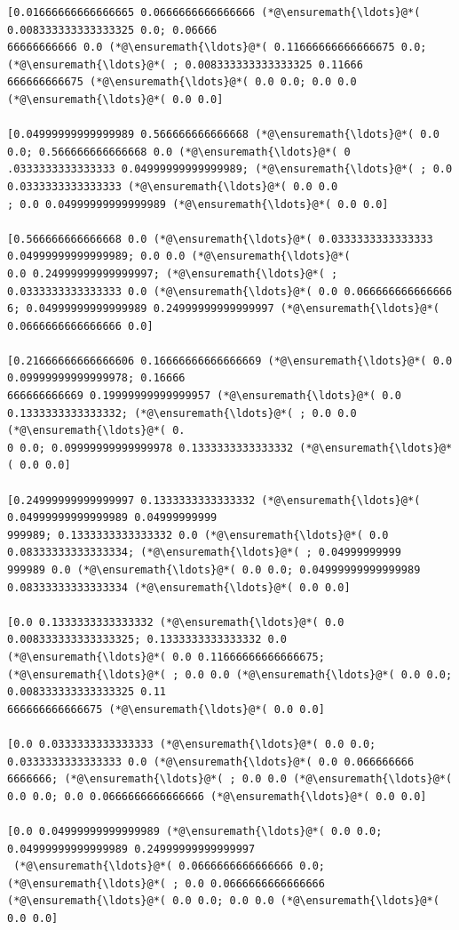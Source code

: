 \documentclass[12pt,a4paper]{article}
\begin{document}
\begin{lstlisting}
[0.01666666666666665 0.0666666666666666 (*@\ensuremath{\ldots}@*( 0.008333333333333325 0.0; 0.06666
66666666666 0.0 (*@\ensuremath{\ldots}@*( 0.11666666666666675 0.0; (*@\ensuremath{\ldots}@*( ; 0.008333333333333325 0.11666
666666666675 (*@\ensuremath{\ldots}@*( 0.0 0.0; 0.0 0.0 (*@\ensuremath{\ldots}@*( 0.0 0.0]

[0.04999999999999989 0.566666666666668 (*@\ensuremath{\ldots}@*( 0.0 0.0; 0.566666666666668 0.0 (*@\ensuremath{\ldots}@*( 0
.0333333333333333 0.04999999999999989; (*@\ensuremath{\ldots}@*( ; 0.0 0.0333333333333333 (*@\ensuremath{\ldots}@*( 0.0 0.0
; 0.0 0.04999999999999989 (*@\ensuremath{\ldots}@*( 0.0 0.0]

[0.566666666666668 0.0 (*@\ensuremath{\ldots}@*( 0.0333333333333333 0.04999999999999989; 0.0 0.0 (*@\ensuremath{\ldots}@*( 
0.0 0.24999999999999997; (*@\ensuremath{\ldots}@*( ; 0.0333333333333333 0.0 (*@\ensuremath{\ldots}@*( 0.0 0.066666666666666
6; 0.04999999999999989 0.24999999999999997 (*@\ensuremath{\ldots}@*( 0.0666666666666666 0.0]

[0.21666666666666606 0.16666666666666669 (*@\ensuremath{\ldots}@*( 0.0 0.09999999999999978; 0.16666
666666666669 0.19999999999999957 (*@\ensuremath{\ldots}@*( 0.0 0.1333333333333332; (*@\ensuremath{\ldots}@*( ; 0.0 0.0 (*@\ensuremath{\ldots}@*( 0.
0 0.0; 0.09999999999999978 0.1333333333333332 (*@\ensuremath{\ldots}@*( 0.0 0.0]

[0.24999999999999997 0.1333333333333332 (*@\ensuremath{\ldots}@*( 0.04999999999999989 0.04999999999
999989; 0.1333333333333332 0.0 (*@\ensuremath{\ldots}@*( 0.0 0.08333333333333334; (*@\ensuremath{\ldots}@*( ; 0.04999999999
999989 0.0 (*@\ensuremath{\ldots}@*( 0.0 0.0; 0.04999999999999989 0.08333333333333334 (*@\ensuremath{\ldots}@*( 0.0 0.0]

[0.0 0.1333333333333332 (*@\ensuremath{\ldots}@*( 0.0 0.008333333333333325; 0.1333333333333332 0.0 
(*@\ensuremath{\ldots}@*( 0.0 0.11666666666666675; (*@\ensuremath{\ldots}@*( ; 0.0 0.0 (*@\ensuremath{\ldots}@*( 0.0 0.0; 0.008333333333333325 0.11
666666666666675 (*@\ensuremath{\ldots}@*( 0.0 0.0]

[0.0 0.0333333333333333 (*@\ensuremath{\ldots}@*( 0.0 0.0; 0.0333333333333333 0.0 (*@\ensuremath{\ldots}@*( 0.0 0.066666666
6666666; (*@\ensuremath{\ldots}@*( ; 0.0 0.0 (*@\ensuremath{\ldots}@*( 0.0 0.0; 0.0 0.0666666666666666 (*@\ensuremath{\ldots}@*( 0.0 0.0]

[0.0 0.04999999999999989 (*@\ensuremath{\ldots}@*( 0.0 0.0; 0.04999999999999989 0.24999999999999997
 (*@\ensuremath{\ldots}@*( 0.0666666666666666 0.0; (*@\ensuremath{\ldots}@*( ; 0.0 0.0666666666666666 (*@\ensuremath{\ldots}@*( 0.0 0.0; 0.0 0.0 (*@\ensuremath{\ldots}@*( 
0.0 0.0]


\end{lstlisting}
\end{document}

